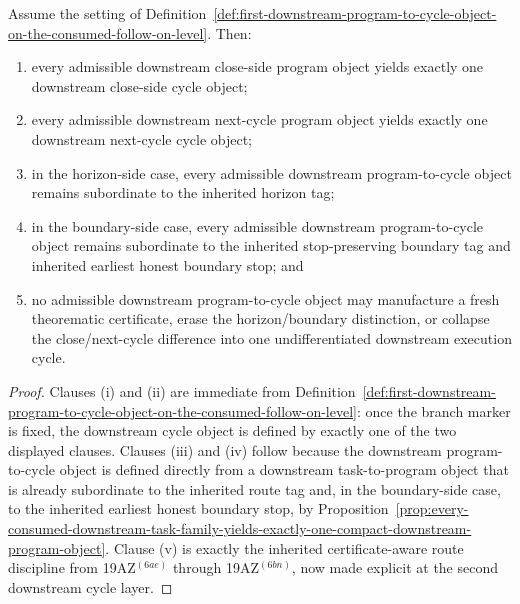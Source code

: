 \begin{proposition}
\label{prop:every-normalized-downstream-program-object-yields-exactly-one-controlled-downstream-cycle}
Assume the setting of Definition~\ref{def:first-downstream-program-to-cycle-object-on-the-consumed-follow-on-level}. Then:
\begin{enumerate}[label=(\roman*)]
 \item every admissible downstream close-side program object yields exactly one downstream close-side cycle object;
 \item every admissible downstream next-cycle program object yields exactly one downstream next-cycle cycle object;
 \item in the horizon-side case, every admissible downstream program-to-cycle object remains subordinate to the inherited horizon tag;
 \item in the boundary-side case, every admissible downstream program-to-cycle object remains subordinate to the inherited stop-preserving boundary tag and inherited earliest honest boundary stop; and
 \item no admissible downstream program-to-cycle object may manufacture a fresh theorematic certificate, erase the horizon/boundary distinction, or collapse the close/next-cycle difference into one undifferentiated downstream execution cycle.
\end{enumerate}
\end{proposition}

\begin{proof}
Clauses (i) and (ii) are immediate from Definition~\ref{def:first-downstream-program-to-cycle-object-on-the-consumed-follow-on-level}: once the branch marker is fixed, the downstream cycle object is defined by exactly one of the two displayed clauses. Clauses (iii) and (iv) follow because the downstream program-to-cycle object is defined directly from a downstream task-to-program object that is already subordinate to the inherited route tag and, in the boundary-side case, to the inherited earliest honest boundary stop, by Proposition~\ref{prop:every-consumed-downstream-task-family-yields-exactly-one-compact-downstream-program-object}. Clause (v) is exactly the inherited certificate-aware route discipline from 19AZ$^{(6ae)}$ through 19AZ$^{(6bn)}$, now made explicit at the second downstream cycle layer.
\end{proof}

